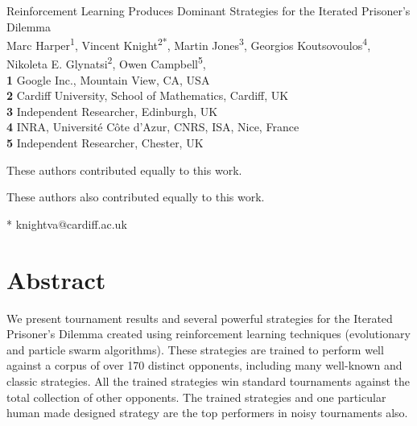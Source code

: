 \documentclass[10pt,letterpaper]{article}
\date{}
\begin{document}
\vspace*{0.2in}

\begin{flushleft}
{\Large
\textbf\newline
{ Reinforcement Learning Produces Dominant Strategies for the Iterated Prisoner's Dilemma }
}
\newline
\\
Marc Harper\textsuperscript{1\Yinyang},
Vincent Knight\textsuperscript{2*\Yinyang},
Martin Jones\textsuperscript{3\ddag},
Georgios Koutsovoulos\textsuperscript{4\ddag},
Nikoleta E. Glynatsi\textsuperscript{2\ddag},
Owen Campbell\textsuperscript{5\ddag},
\\
\bigskip
\textbf{1} Google Inc., Mountain View, CA, USA
\\
\textbf{2} Cardiff University, School of Mathematics, Cardiff, UK
\\
\textbf{3} Independent Researcher, Edinburgh, UK
\\
\textbf{4} INRA, Universit\'{e} C\^{o}te d'Azur, CNRS, ISA, Nice, France
\\
\textbf{5} Independent Researcher, Chester, UK
\\
\bigskip

%
%
\Yinyang These authors contributed equally to this work.

\ddag These authors also contributed equally to this work.


* knightva@cardiff.ac.uk

\end{flushleft}
\section*{Abstract}
    We present tournament results and several powerful strategies for the Iterated
    Prisoner's Dilemma created using reinforcement learning techniques
    (evolutionary and particle swarm algorithms). These strategies are
    trained to perform well against a corpus of over 170 distinct
    opponents, including many well-known and classic strategies. All
    the trained strategies win standard tournaments against the total collection
    of other opponents. The trained strategies and one particular human made
    designed strategy are the top performers in noisy tournaments also.
\linenumbers
\end{document}
